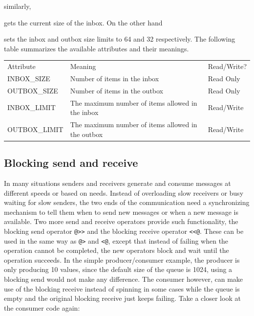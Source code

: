 
\noindent similarly, 


\noindent
gets the current size of the inbox. On the other hand


sets the inbox and outbox size limits to 64 and 32 respectively. The following
table summarizes the available attributes and their meanings.


\bigskip

\begin{flushleft}
\tablehead{}
\begin{supertabular}{m{2.0941598in}m{1.9087598in}m{1.9108598in}}
Attribute &
Meaning &
Read/Write?\\
INBOX\_SIZE &
Number of items in the inbox &
Read Only\\
OUTBOX\_SIZE &
Number of items in the outbox &
Read Only\\
INBOX\_LIMIT &
The maximum number of items allowed in the inbox &
Read/Write\\
OUTBOX\_LIMIT &
The maximum number of items allowed in the outbox &
Read/Write\\
\end{supertabular}
\end{flushleft}


\subsection*{Blocking send and receive}

In many situations senders and receivers generate and consume messages at
different speeds or based on needs. Instead of overloading slow receivers or
busy waiting for slow senders, the two ends of the communication need a
synchronizing mechanism to tell them when to send new messages or when a new
message is available. Two more send and receive operators provide such
functionality, the blocking send operator \texttt{@>{}>} and the blocking
receive operator \texttt{<{}<@}.  These can be used in the same way as
\texttt{@>} and \texttt{{<}@}, except that instead of failing when the operation
cannot be completed, the new operators block and wait until the operation
succeeds. In the simple producer/consumer example, the producer is only
producing 10 values, since the default size of the queue is 1024, using a
blocking send would not make any difference. The consumer however, can make use
of the blocking receive instead of spinning in some cases while the queue is
empty and the original blocking receive just keeps failing.  Take a closer look
at the consumer code again:

